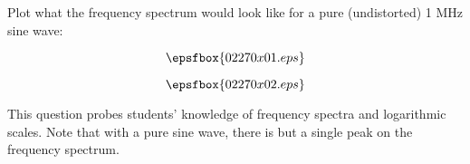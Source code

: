

Plot what the frequency spectrum would look like for a pure (undistorted) 1 MHz sine wave:

$$\epsfbox{02270x01.eps}$$







$$\epsfbox{02270x02.eps}$$







This question probes students' knowledge of frequency spectra and logarithmic scales.  Note that with a pure sine wave, there is but a single peak on the frequency spectrum.




